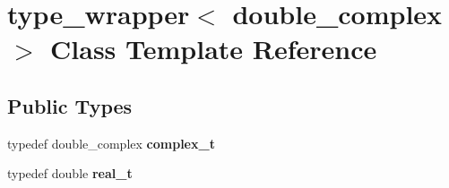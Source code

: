 \hypertarget{classtype__wrapper_3_01double__complex_01_4}{}\section{type\+\_\+wrapper$<$ double\+\_\+complex $>$ Class Template Reference}
\label{classtype__wrapper_3_01double__complex_01_4}
\subsection*{Public Types}
\begin{DoxyCompactItemize}
\item 
\hypertarget{classtype__wrapper_3_01double__complex_01_4_ae1c5a434ac67c7a3a9db6b3fc850ff9a}{}typedef double\+\_\+complex {\bfseries complex\+\_\+t}\label{classtype__wrapper_3_01double__complex_01_4_ae1c5a434ac67c7a3a9db6b3fc850ff9a}

\item 
\hypertarget{classtype__wrapper_3_01double__complex_01_4_a8f465f496e92ae1bedae599a12d71afd}{}typedef double {\bfseries real\+\_\+t}\label{classtype__wrapper_3_01double__complex_01_4_a8f465f496e92ae1bedae599a12d71afd}

\end{DoxyCompactItemize}
